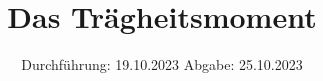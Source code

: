 



\subject{V101}
\title{Das Trägheitsmoment}
\date{%
  Durchführung: 19.10.2023
  \hspace{3em}
  Abgabe: 25.10.2023
}



\maketitle
\thispagestyle{empty}
\tableofcontents
\newpage






\cite{numpy}
\printbibliography{}


